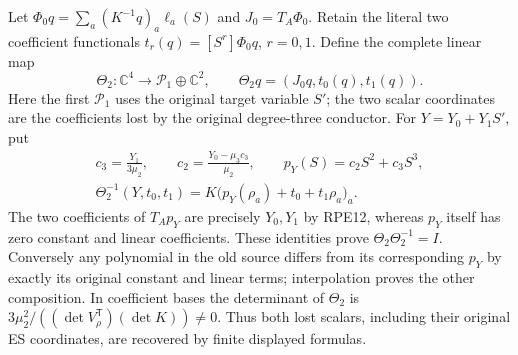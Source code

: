 Let $\Phi_0q=\sum_a(K^{-1}q)_a\ell_a(S)$ and
$J_0=T_A\Phi_0$. Retain the literal two coefficient functionals
$t_r(q)=[S^r]\Phi_0q$, $r=0,1$. Define the complete linear map
\[
 \Theta_2:\mathbb C^4\longrightarrow\mathcal P_1\oplus\mathbb C^2,
 \qquad \Theta_2q=(J_0q,t_0(q),t_1(q)).
 \tag{RPE20}
\]
Here the first $\mathcal P_1$ uses the original target variable $S'$;
the two scalar coordinates are the coefficients lost by the original
degree-three conductor. For $Y=Y_0+Y_1S'$, put
\[
 \begin{gathered}
 c_3=\frac{Y_1}{3\mu_2},\qquad
 c_2=\frac{Y_0-\mu_3c_3}{\mu_2},\qquad
 p_Y(S)=c_2S^2+c_3S^3,\\
 \Theta_2^{-1}(Y,t_0,t_1)
       =K\bigl(p_Y(\rho_a)+t_0+t_1\rho_a\bigr)_a.
 \end{gathered}\tag{RPE21}
\]
The two coefficients of $T_Ap_Y$ are precisely $Y_0,Y_1$ by
RPE12, whereas $p_Y$ itself has zero constant and linear coefficients.
These identities prove $\Theta_2\Theta_2^{-1}=I$.
Conversely any polynomial in the old source differs from its
corresponding $p_Y$ by exactly its original constant and linear
terms; interpolation proves the other composition. In coefficient
bases the determinant of $\Theta_2$ is
$3\mu_2^2/((\det V_\rho^{\mathsf T})(\det K))\ne0$.
Thus both lost scalars, including their original ES coordinates,
are recovered by finite displayed formulas.

